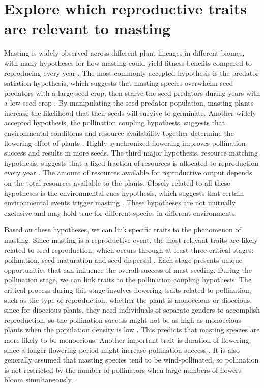 \documentclass[11pt,letter]{article}
\begin{document}
\section{Explore which reproductive traits are relevant to masting}
Masting is widely observed across different plant lineages in different biomes, with many hypotheses for how masting could yield fitness benefits compared to reproducing every year \citep{koenig2021brief, waller1979models}. The most commonly accepted hypothesis is the predator satiation hypothesis, which suggests that masting species overwhelm seed predators with a large seed crop, then starve the seed predators during years with a low seed crop \citep{janzen1971seed}. By manipulating the seed predator population, masting plants increase the likelihood that their seeds will survive to germinate. Another widely accepted hypothesis, the pollination coupling hypothesis, suggests that environmental conditions and resource availability together determine the flowering effort of plants \citep{crone2014resource}. Highly synchronized flowering improves pollination success and results in more seeds. The third major hypothesis, resource matching hypothesis, suggests that a fixed fraction of resources is allocated to reproduction every year \citep{kelly1994evolutionary}. The amount of resources available for reproductive output depends on the total resources available to the plants. Closely related to all these hypotheses is the environmental cues hypothesis, which suggests that certain environmental events trigger masting \citep{pearse2016mechanisms}. These hypotheses are not mutually exclusive and may hold true for different species in different environments.\par
Based on these hypotheses, we can link specific traits to the phenomenon of masting. Since masting is a reproductive event, the most relevant traits are likely related to seed reproduction, which occurs through at least three critical stages: pollination, seed maturation and seed dispersal \citep{satake2021studying}. Each stage presents unique opportunities that can influence the overall success of mast seeding. During the pollination stage, we can link traits to the pollination coupling hypothesis. The critical process during this stage involves flowering traits related to pollination, such as the type of reproduction, whether the plant is monoecious or dioecious, since for dioecious plants, they need individuals of separate genders to accomplish reproduction, so the pollination success might not be as high as monoecious plants when the population density is low \citep{bawa1980evolution}. This predicts that masting species are more likely to be monoecious. Another important trait is duration of flowering, since a longer flowering period might increase pollination success \citep{knight2005pollen}. It is also generally assumed that masting species tend to be wind-pollinated, so pollination is not restricted by the number of pollinators when large numbers of flowers bloom simultaneously \citep{bogdziewicz2017masting, bogdziewicz2020flowering}.\par
\end{document}
